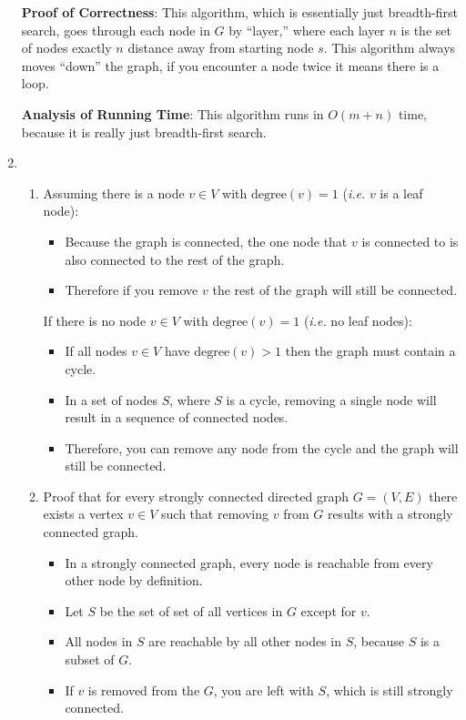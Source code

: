 \documentclass[a4paper, 10pt]{article}
\begin{document}
\begin{enumerate}
		\textbf{Proof of Correctness}: This algorithm, which is essentially just
		breadth-first search, goes through each node in $G$ by ``layer,''
		where each layer $n$ is the set of nodes exactly $n$ distance away from
		starting node $s$. This algorithm always moves ``down'' the graph, if
		you encounter a node twice it means there is a loop.

		\textbf{Analysis of Running Time}: This algorithm runs in $O(m + n)$
		time, because it is really just breadth-first search.

	\item \begin{enumerate}
			\item
				Assuming there is a node $v \in V$ with $\textrm{degree} (v) =
				1$ (\textit{i.e.} $v$ is a leaf node):

				\begin{itemize}
					\item Because the graph is connected, the one node that $v$
						is connected to is also connected to the rest of the
						graph.
					\item Therefore if you remove $v$ the rest of the graph will
						still be connected.
					
				\end{itemize}

				If there is no node $v \in V$ with $\textrm{degree} (v) = 1$
				(\textit{i.e.} no leaf nodes):

				\begin{itemize}
					\item If all nodes $v \in V$ have $\textrm{degree} (v) > 1$
						then the graph must contain a cycle.
					\item In a set of nodes $S$, where $S$ is a cycle, removing
						a single node will result in a sequence of connected
						nodes.   
					\item Therefore, you can remove any node from the cycle and
						the graph will still be connected.
				\end{itemize}

			\item Proof that for every strongly connected directed graph $G =
				(V, E)$ there exists a vertex $v \in V$ such that removing $v$
				from $G$ results with a strongly connected graph.

				\begin{itemize}
					\item In a strongly connected graph, every node is reachable
						from every other node by definition.
					\item Let $S$ be the set of set of all vertices in $G$
						except for $v$.
					\item All nodes in $S$ are reachable by all other nodes in
						$S$, because $S$ is a subset of $G$.
					\item If $v$ is removed from the $G$, you are left with $S$,
						which is still strongly connected.
				\end{itemize}
		\end{enumerate}



\end{enumerate}
\end{document}

